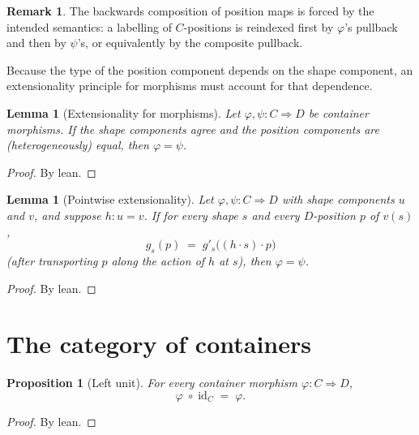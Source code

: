 \documentclass[11pt,a4paper]{article}
\theoremstyle{plain}
\newtheorem{proposition}[theorem]{Proposition}
\newtheorem{lemma}[theorem]{Lemma}
\theoremstyle{definition}
\newtheorem{remark}[theorem]{Remark}
\newcommand{\id}{\mathrm{id}}
\begin{document}
\begin{remark}
The backwards composition of position maps is forced by the intended
semantics: a labelling of $C$-positions is reindexed first by $\varphi$'s
pullback and then by $\psi$'s, or equivalently by the composite pullback.
\end{remark}

Because the type of the position component depends on the shape component, an
extensionality principle for morphisms must account for that dependence.

\begin{lemma}[Extensionality for morphisms]\label{lem:ext}
Let $\varphi,\psi:C\Rightarrow D$ be container morphisms. If the shape
components agree and the position components are (heterogeneously) equal, then
$\varphi=\psi$.
\end{lemma}

\begin{proof}
By lean.
\end{proof}

\begin{lemma}[Pointwise extensionality]\label{lem:ext-prime}
Let $\varphi,\psi:C\Rightarrow D$ with shape components $u$ and $v$, and
suppose $h:u=v$. If for every shape $s$ and every $D$-position $p$ of $v(s)$,
\[
  g_s(p) \;=\; g'_s\bigl((h\cdot s)\cdot p\bigr)
\]
(after transporting $p$ along the action of $h$ at $s$), then $\varphi=\psi$.
\end{lemma}

\begin{proof}
By lean.
\end{proof}

\section{The category of containers}

\begin{proposition}[Left unit]\label{prop:id-comp}
For every container morphism $\varphi:C\Rightarrow D$,
\begin{equation}
  \varphi \;\circ\; \id_C \;=\; \varphi.
\end{equation}
\end{proposition}

\begin{proof}
By lean.
\end{proof}
\end{document}
